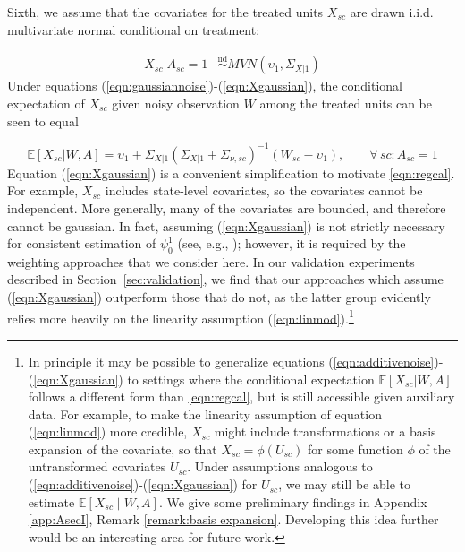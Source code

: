 \documentclass[aoas]{imsart}
\theoremstyle{plain}
\theoremstyle{remark}
\begin{document}
Sixth, we assume that the covariates for the treated units $X_{sc}$ are drawn i.i.d. multivariate normal conditional on treatment:

\begin{align} \label{eqn:Xgaussian}
    X_{sc}|A_{sc} = 1 & \stackrel{\text{iid}}{\sim} MVN(\upsilon_1, \Sigma_{X|1})%
\end{align}
%
Under equations (\ref{eqn:gaussiannoise})-(\ref{eqn:Xgaussian}), the conditional expectation of $X_{sc}$ given noisy observation $W$ among the treated units can be seen to equal 

\begin{equation} \label{eqn:regcal}
\mathbb{E}[X_{sc}| W, A] = \upsilon_1 + \Sigma_{X|1} \left(\Sigma_{X|1} + \Sigma_{\nu, sc}\right)^{-1}  (W_{sc} - \upsilon_1), \qquad \forall\, sc: A_{sc} = 1
\end{equation}
%
Equation (\ref{eqn:Xgaussian}) is a convenient simplification to motivate \eqref{eqn:regcal}. For example, $X_{sc}$ includes state-level covariates, so the covariates cannot be independent. More generally, many of the covariates are bounded, and therefore cannot be gaussian. In fact, assuming (\ref{eqn:Xgaussian}) is not strictly necessary for consistent estimation of $\psi_0^1$ (see, e.g., \cite{gleser1992importance}); however, it is required by the weighting approaches that we consider here. In our validation experiments described in Section~\ref{sec:validation}, we find that our approaches which assume (\ref{eqn:Xgaussian}) outperform those that do not, as the latter group evidently relies more heavily on the linearity assumption (\ref{eqn:linmod}).\footnote{In principle it may be possible to generalize equations (\ref{eqn:additivenoise})-(\ref{eqn:Xgaussian}) to settings where the conditional expectation $\mathbb{E}[X_{sc}|W,A]$ follows a different form than \eqref{eqn:regcal}, but is still accessible given auxiliary data. For example, to make the linearity assumption of equation (\ref{eqn:linmod}) more credible, $X_{sc}$ might include transformations or a basis expansion of the covariate, so that $X_{sc} = \phi(U_{sc})$ for some function $\phi$ of the untransformed covariates $U_{sc}$. Under assumptions analogous to (\ref{eqn:additivenoise})-(\ref{eqn:Xgaussian}) for $U_{sc}$, we may still be able to estimate $\mathbb{E}[X_{sc} \mid W, A]$. We give some preliminary findings in Appendix \ref{app:AsecI}, Remark \ref{remark:basis expansion}. Developing this idea further would be an interesting area for future work.}
 
\end{document}
